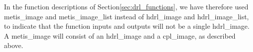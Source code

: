 In the function descriptions of Section\ref{sec:drl_functions}, we have therefore used  metis\_image and metis\_image\_list instead of hdrl\_image and hdrl\_image\_list, to indicate that the function inputs and outputs will not be a single hdrl\_image. A metis\_image will consist of an hdrl\_image and a cpl\_image, as described above.








